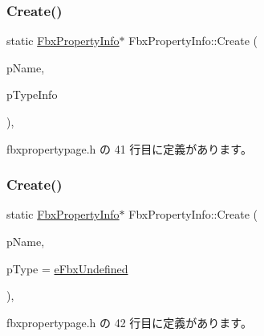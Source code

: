 \subsubsection{\texorpdfstring{Create()}{Create()}\hspace{0.1cm}{\footnotesize\ttfamily [1/2]}}
{\footnotesize\ttfamily static \hyperlink{class_fbx_property_info}{Fbx\+Property\+Info}$\ast$ Fbx\+Property\+Info\+::\+Create (\begin{DoxyParamCaption}\item[{const char $\ast$}]{p\+Name,  }\item[{\hyperlink{class_fbx_property_page}{Fbx\+Property\+Page} $\ast$}]{p\+Type\+Info }\end{DoxyParamCaption})\hspace{0.3cm}{\ttfamily [inline]}, {\ttfamily [static]}}



 fbxpropertypage.\+h の 41 行目に定義があります。

\mbox{\label{class_fbx_property_info_a8cf0ec9c51968ff02688038fe93de49a}} 
\subsubsection{\texorpdfstring{Create()}{Create()}\hspace{0.1cm}{\footnotesize\ttfamily [2/2]}}
{\footnotesize\ttfamily static \hyperlink{class_fbx_property_info}{Fbx\+Property\+Info}$\ast$ Fbx\+Property\+Info\+::\+Create (\begin{DoxyParamCaption}\item[{const char $\ast$}]{p\+Name,  }\item[{\hyperlink{fbxpropertytypes_8h_a73913a5ddfb20e57c6f25e9e6784bd92}{E\+Fbx\+Type}}]{p\+Type = {\ttfamily \hyperlink{fbxpropertytypes_8h_a73913a5ddfb20e57c6f25e9e6784bd92a150b400dddd0f8b5c7e22a1bba0721d8}{e\+Fbx\+Undefined}} }\end{DoxyParamCaption})\hspace{0.3cm}{\ttfamily [inline]}, {\ttfamily [static]}}



 fbxpropertypage.\+h の 42 行目に定義があります。

\mbox{\label{class_fbx_property_info_abea3d3ce25a205502657711eb7e2c6f2}} 
